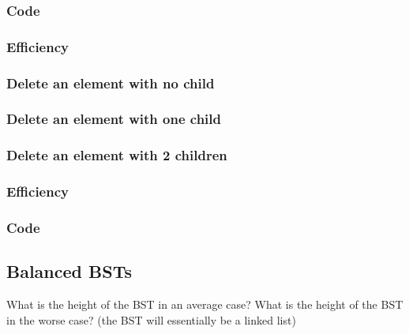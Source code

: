 \documentclass[12pt,a4paper]{article}
\begin{document}
\subsubsection{Code}

\subsubsection{Efficiency}

\subsubsection{Delete an element with no child}

\subsubsection{Delete an element with one child}

\subsubsection{Delete an element with 2 children}

\subsubsection{Efficiency}

\subsubsection{Code}

\subsection{Balanced BSTs}
What is the height of the BST in an average case?
What is the height of the BST in the worse case? (the BST will essentially be a linked list)
\end{document}
